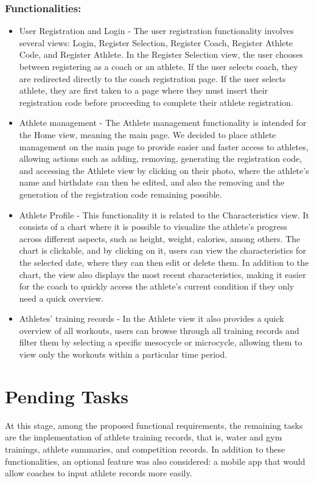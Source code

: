 \documentclass[a4paper,twoside,11pt]{article}
\begin{document}
\subsubsection{Functionalities:}
\begin{itemize}
\item User Registration and Login - 
The user registration functionality involves several views: Login, Register Selection, Register Coach, Register Athlete Code, and Register Athlete.
In the Register Selection view, the user chooses between registering as a coach or an athlete.
If the user selects coach, they are redirected directly to the coach registration page.
If the user selects athlete, they are first taken to a page where they must insert their registration code before proceeding to complete their athlete registration.

\item Athlete management - 
The Athlete management functionality is intended for the Home view, meaning the main page. We decided to place athlete management on the main page to provide easier and faster access to athletes, allowing actions such as adding, removing, generating the registration code, and accessing the Athlete view by clicking on their photo, where the athlete’s name and birthdate can then be edited, and also the removing and the generation of the registration code remaining possible. 

\item Athlete Profile - 
This functionality it is related to the Characteristics view. It consists of a chart where it is possible to visualize the athlete’s progress across different aspects, such as height, weight, calories, among others. The chart is clickable, and by clicking on it, users can view the characteristics for the selected date, where they can then edit or delete them. In addition to the chart, the view also displays the most recent characteristics, making it easier for the coach to quickly access the athlete's current condition if they only need a quick overview.

\item Athletes' training records -
In the Athlete view it also provides a quick overview of all workouts, users can browse through all training records and filter them by selecting a specific mesocycle or microcycle, allowing them to view only the workouts within a particular time period.

\end{itemize}

\section{Pending Tasks}
At this stage, among the proposed functional requirements, the remaining tasks are the implementation of athlete training records, that is, water and gym trainings, athlete summaries, and competition records. In addition to these functionalities, an optional feature was also considered: a mobile app that would allow coaches to input athlete records more easily.
\end{document}
